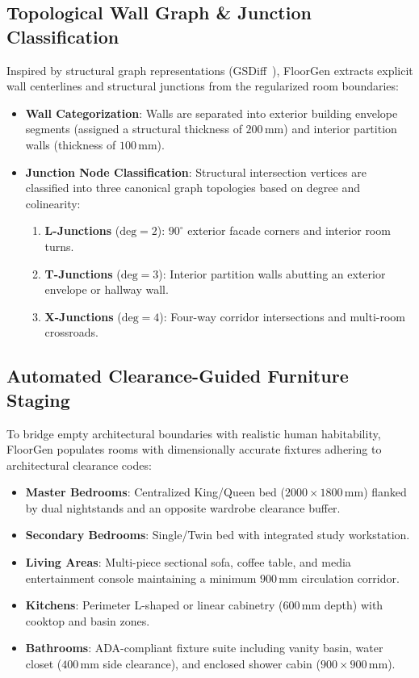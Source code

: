 \documentclass[journal]{IEEEtran}
\begin{document}
\subsection{Topological Wall Graph \& Junction Classification}
Inspired by structural graph representations (GSDiff~\cite{hu2025gsdiff}), FloorGen extracts explicit wall centerlines and structural junctions from the regularized room boundaries:
\begin{itemize}
    \item \textbf{Wall Categorization}: Walls are separated into exterior building envelope segments (assigned a structural thickness of $200\,\mathrm{mm}$) and interior partition walls (thickness of $100\,\mathrm{mm}$).
    \item \textbf{Junction Node Classification}: Structural intersection vertices are classified into three canonical graph topologies based on degree and colinearity:
    \begin{enumerate}
        \item \textbf{L-Junctions} ($\text{deg}=2$): $90^\circ$ exterior facade corners and interior room turns.
        \item \textbf{T-Junctions} ($\text{deg}=3$): Interior partition walls abutting an exterior envelope or hallway wall.
        \item \textbf{X-Junctions} ($\text{deg}=4$): Four-way corridor intersections and multi-room crossroads.
    \end{enumerate}
\end{itemize}

\subsection{Automated Clearance-Guided Furniture Staging}
To bridge empty architectural boundaries with realistic human habitability, FloorGen populates rooms with dimensionally accurate fixtures adhering to architectural clearance codes:
\begin{itemize}
    \item \textbf{Master Bedrooms}: Centralized King/Queen bed ($2000 \times 1800\,\mathrm{mm}$) flanked by dual nightstands and an opposite wardrobe clearance buffer.
    \item \textbf{Secondary Bedrooms}: Single/Twin bed with integrated study workstation.
    \item \textbf{Living Areas}: Multi-piece sectional sofa, coffee table, and media entertainment console maintaining a minimum $900\,\mathrm{mm}$ circulation corridor.
    \item \textbf{Kitchens}: Perimeter L-shaped or linear cabinetry ($600\,\mathrm{mm}$ depth) with cooktop and basin zones.
    \item \textbf{Bathrooms}: ADA-compliant fixture suite including vanity basin, water closet ($400\,\mathrm{mm}$ side clearance), and enclosed shower cabin ($900 \times 900\,\mathrm{mm}$).
\end{itemize}
\end{document}
